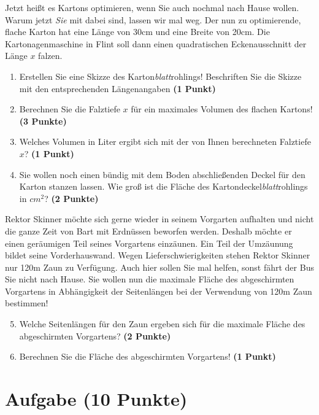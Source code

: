 \documentclass[a4paper, 9pt]{scrartcl}\usepackage[]{graphicx}\usepackage[]{xcolor}
\begin{document}
Jetzt heißt es Kartons optimieren, wenn Sie auch nochmal nach Hause wollen. Warum jetzt \textit{Sie} mit dabei sind, lassen wir mal weg. Der nun zu optimierende, flache Karton hat eine Länge von 30cm und eine Breite von 20cm. Die Kartonagenmaschine in Flint soll dann einen quadratischen Eckenausschnitt der Länge $x$ falzen.

\begin{enumerate}
\item Erstellen Sie eine Skizze des Karton\textit{blatt}rohlings! Beschriften Sie die Skizze mit den entsprechenden Längenangaben \textbf{(1 Punkt)}
\item Berechnen Sie die Falztiefe $x$ für ein maximales Volumen des flachen Kartons! \textbf{(3 Punkte)}
\item Welches Volumen in Liter ergibt sich mit der von Ihnen berechneten Falztiefe $x$?  \textbf{(1 Punkt)}
\item Sie wollen noch einen bündig mit dem Boden abschließenden Deckel für den Karton stanzen lassen. Wie groß ist die Fläche des Kartondeckel\textit{blatt}rohlings in $cm^2$? \textbf{(2 Punkte)}
\end{enumerate}

Rektor Skinner möchte sich gerne wieder in seinem Vorgarten aufhalten und nicht die ganze Zeit von Bart mit Erdnüssen beworfen werden. Deshalb möchte er einen geräumigen Teil seines Vorgartens einzäunen. Ein Teil der Umzäunung bildet seine Vorderhauswand. Wegen Lieferschwierigkeiten stehen Rektor Skinner nur 120m Zaun zu Verfügung. Auch hier sollen Sie mal helfen, sonst fährt der Bus Sie nicht nach Hause. Sie wollen nun die maximale Fläche des abgeschirmten Vorgartens in Abhängigkeit der Seitenlängen bei der Verwendung von 120m Zaun bestimmen!

\begin{enumerate}
  \setcounter{enumi}{4}  
\item  Welche Seitenlängen für den Zaun ergeben sich für die maximale Fläche des abgeschirmten Vorgartens? \textbf{(2 Punkte)}
\item Berechnen Sie die Fläche des abgeschirmten Vorgartens! \textbf{(1 Punkt)}
\end{enumerate}

 
\clearpage

\section{Aufgabe \hfill (10 Punkte)}
\end{document}
